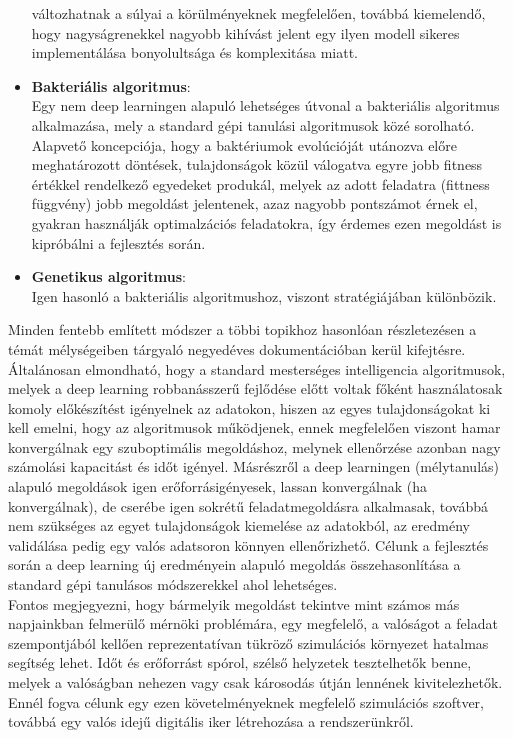 \documentclass{article}
\begin{document}
\begin{itemize}
     változhatnak a súlyai a körülményeknek megfelelően, továbbá kiemelendő, hogy nagyságrenekkel
     nagyobb kihívást jelent egy ilyen modell sikeres implementálása bonyolultsága és komplexitása miatt.
    \item \textbf{Bakteriális algoritmus}:\\
    Egy nem deep learningen alapuló lehetséges útvonal a bakteriális algoritmus alkalmazása, 
    mely a standard gépi tanulási algoritmusok közé sorolható. Alapvető koncepciója, hogy
    a baktériumok evolúcióját utánozva előre meghatározott döntések, tulajdonságok közül válogatva
    egyre jobb fitness értékkel rendelkező egyedeket produkál, melyek az adott feladatra
    (fittness függvény) jobb megoldást jelentenek, azaz nagyobb pontszámot érnek el, gyakran használják
    optimalzációs feladatokra, így érdemes ezen megoldást is kipróbálni a fejlesztés során.
    \item \textbf{Genetikus algoritmus}:\\
    Igen hasonló a bakteriális algoritmushoz, viszont stratégiájában különbözik.
 \end{itemize}
 Minden fentebb említett módszer a többi topikhoz hasonlóan részletezésen a témát mélységeiben
 tárgyaló negyedéves dokumentációban kerül kifejtésre.\vspace{5pt}\\
 Általánosan elmondható, hogy a standard mesterséges intelligencia algoritmusok, melyek
 a deep learning robbanásszerű fejlődése előtt voltak főként használatosak komoly előkészítést igényelnek
 az adatokon, hiszen az egyes tulajdonságokat ki kell emelni, hogy az algoritmusok működjenek,
 ennek megfelelően viszont hamar konvergálnak egy szuboptimális megoldáshoz, melynek ellenőrzése azonban nagy számolási kapacitást és időt igényel. Másrészről 
 a deep learningen (mélytanulás) alapuló megoldások igen erőforrásigényesek, lassan konvergálnak (ha konvergálnak),
 de cserébe igen sokrétű feladatmegoldásra alkalmasak, továbbá nem szükséges az egyet tulajdonságok kiemelése az adatokból,
 az eredmény validálása pedig egy valós adatsoron könnyen ellenőrizhető. Célunk a fejlesztés során
 a deep learning új eredményein alapuló megoldás összehasonlítása a standard gépi tanulásos 
 módszerekkel ahol lehetséges. \vspace{5pt}\\
 Fontos megjegyezni, hogy bármelyik megoldást tekintve mint számos más napjainkban felmerülő
 mérnöki problémára, egy megfelelő, a valóságot a feladat szempontjából kellően reprezentatívan
 tükröző szimulációs környezet hatalmas segítség lehet. Időt és erőforrást spórol, szélső
 helyzetek tesztelhetők benne, melyek a valóságban nehezen vagy csak károsodás útján lennének
 kivitelezhetők. Ennél fogva célunk egy ezen követelményeknek megfelelő szimulációs szoftver, továbbá egy valós idejű digitális iker létrehozása a rendszerünkről.
\end{document}
